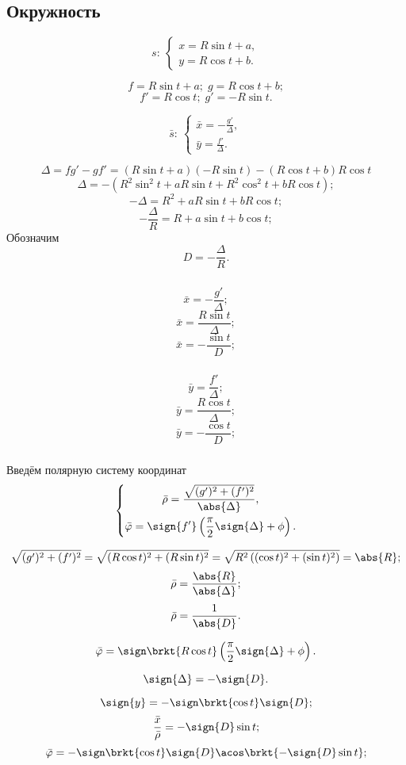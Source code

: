 \subsection{Окружность}
$$s: \: 
\left\{ \begin{gathered}
	x = R\sin{t}+a,\\
	y = R\cos{t}+b.
\end{gathered} \right.
$$

$$f = R\sin{t}+a; \; g = R\cos{t}+b;$$
$$f' = R\cos{t}; \; g' = -R\sin{t}.$$

$$\bar{s}:
\:
\left\{
\begin{gathered}
	\bar{x} =  -\frac{g'}{\Delta},\\
	\bar{y} =  \frac{f'}{\Delta}.
\end{gathered}
\right.
$$

$$\Delta = f g' - g f' = (R\sin{t}+a)(-R\sin{t}) - (R\cos{t}+b) R\cos{t} $$
$$\Delta = -\left(R^2\sin^2{t}+aR\sin{t} + R^2\cos^2{t} +bR\cos{t}\right);$$
$$-\Delta = R^2 + aR\sin{t} + bR\cos{t};$$
$$-\frac{\Delta}{R} = R + a\sin{t} + b\cos{t};$$
Обозначим 
$$D = -\frac{\Delta}{R}.$$

\begin{multicols}{2}
\subparagraph{}
$$\bar{x} =  -\frac{g'}{\Delta};$$
$$\bar{x} =  \frac{R \sin{t}}{\Delta};$$
$$\bar{x} =  -\frac{\sin{t}}{D};$$

\subparagraph{}
$$\bar{y} =  \frac{f'}{\Delta};$$
$$\bar{y} =  \frac{R \cos{t}}{\Delta};$$
$$\bar{y} =  -\frac{\cos{t}}{D};$$
\end{multicols}

\subparagraph{} Введём полярную систему координат
$$\left\{
\begin{gathered}
	\bar{\rho} = \frac{\sqrt{(g')^2 + (f')^2}}{\abs{\Delta}},\\
	\bar{\varphi} = \sign{f'}\left(\frac{\pi}{2}\sign{\Delta} + \phi \right).
\end{gathered}
\right.
$$

$$\sqrt{(g')^2 + (f')^2} =  \sqrt{(R\cos{t})^2 + (R\sin{t})^2} = \sqrt{R^2\left( (\cos{t})^2 + (\sin{t})^2 \right)} = \abs{R};$$
$$\bar{\rho} = \frac{\abs{R}}{\abs{\Delta}};$$
$$\bar{\rho} = \frac{1}{\abs{D}}.$$

$$\bar{\varphi} = \sign\brkt{R\cos{t}}\left(\frac{\pi}{2}\sign{\Delta} + \phi \right).$$

$$\sign{\Delta} = -\sign{D}.$$


$$\sign{y} = -\sign\brkt{\cos{t}}\sign{D};$$
$$\frac{\bar{x}}{\bar{\rho}} = -\sign{D}\sin{t};$$
$$\bar{\varphi} = -\sign\brkt{\cos{t}}\sign{D}\acos\brkt{-\sign{D}\sin{t}};$$

